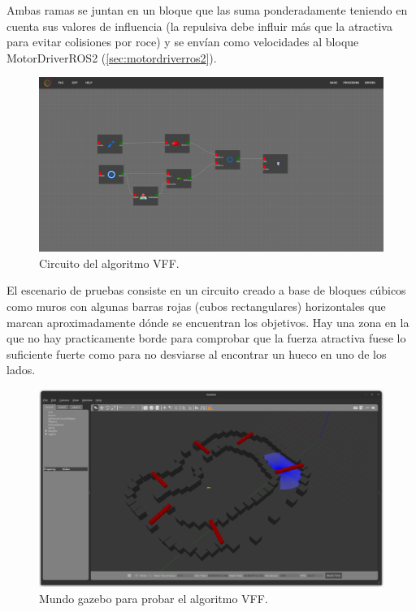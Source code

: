Ambas ramas se juntan en un bloque que las suma ponderadamente teniendo en cuenta sus valores de influencia (la repulsiva debe influir más que la
atractiva para evitar colisiones por roce) y se envían como velocidades al bloque MotorDriverROS2 (\ref{sec:motordriverros2}).
\begin{figure} [H]
    \begin{center}
        \includegraphics[width=12cm]{figs/c6/VFF_circ.png}
    \end{center}
    \caption[Circuito VFF]{Circuito del algoritmo VFF.}
    \label{fig:VFF_circ}
\end{figure}
El escenario de pruebas consiste en un circuito creado a base de bloques cúbicos como muros con algunas barras rojas (cubos rectangulares) horizontales que marcan
aproximadamente dónde se encuentran los objetivos. Hay una zona en la que no hay practicamente borde para comprobar que la fuerza atractiva fuese lo suficiente fuerte
como para no desviarse al encontrar un hueco en uno de los lados.

\begin{figure} [H]
    \begin{center}
        \includegraphics[width=12cm]{figs/c6/VFF_world.png}
    \end{center}
    \caption[Mundo para VFF]{Mundo gazebo para probar el algoritmo VFF.}
    \label{fig:VFF_world}
\end{figure}

